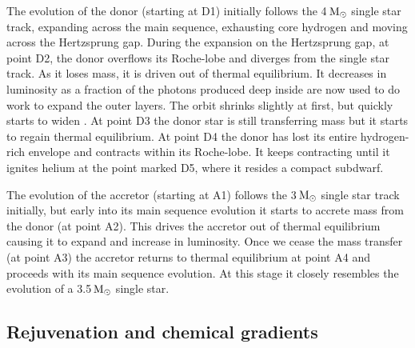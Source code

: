 \documentclass[desactivate]{aa}
\begin{document}
The evolution of the donor (starting at D1) initially follows the 4$\,{\rm M_\odot}$ single star track, expanding across the main sequence, exhausting core hydrogen and moving across the Hertzsprung gap. During the expansion on the Hertzsprung gap, at point D2, the donor overflows its Roche-lobe and diverges from the single star track. As it loses mass, it is driven out of thermal equilibrium. It decreases in luminosity as a fraction of the photons produced deep inside are now used to do work to expand the outer layers.  The orbit shrinks slightly at first, but quickly starts to widen \citep{Renzo+2019:2019A&A...624A..66R}. At point D3 the donor star is still transferring mass but it starts to regain thermal equilibrium. At point D4 the donor has lost its entire hydrogen-rich envelope and contracts within its Roche-lobe. It keeps contracting until it ignites helium at the point marked D5, where it resides a compact subdwarf.   



The evolution of the accretor (starting at A1) follows the 3$\,{\rm M_\odot}$ single star track initially, but early into its main sequence evolution it starts to accrete mass from the donor (at point A2).  This drives the accretor out of thermal equilibrium causing it to expand and increase in luminosity. Once we cease the mass transfer (at point A3) the accretor returns to thermal equilibrium at point A4 and proceeds with its main sequence evolution. At this stage it closely resembles the evolution of a 3.5$\,{\rm M_\odot}$ single star.

\subsection{Rejuvenation and chemical gradients}\label{sec:xh_profiles}
\end{document}

